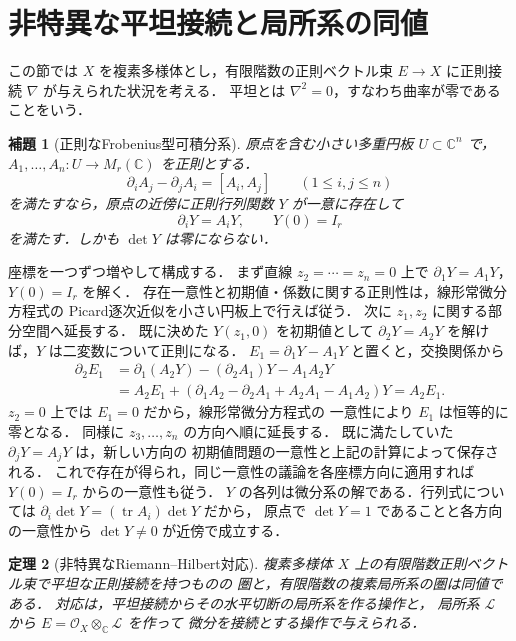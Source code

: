 \documentclass[a5paper,10pt,onecolumn]{jsarticle}
\makeatletter
\theoremstyle{mathnotetheorem}
\newtheorem{theorem}{定理}[section]
\newtheorem{lemma}[theorem]{補題}
\renewcommand{\proofname}{証明}
\renewenvironment{proof}[1][\proofname]{%
  \par\pushQED{\qed}\normalfont\topsep4\p@\@plus2\p@\relax
  \trivlist\item[\hskip\labelsep\bfseries #1]\ignorespaces
}{\popQED\endtrivlist\@endpefalse}
\makeatother
\begin{document}
\section{非特異な平坦接続と局所系の同値}
この節では $X$ を複素多様体とし，有限階数の正則ベクトル束
$E\to X$ に正則接続 $\nabla$ が与えられた状況を考える．
平坦とは $\nabla^2=0$，すなわち曲率が零であることをいう．
\begin{lemma}[正則なFrobenius型可積分系]\label{lem:flatmatrix}
原点を含む小さい多重円板 $U\subset\mathbb C^n$ で，
$A_1,\ldots,A_n:U\to M_r(\mathbb C)$ を正則とする．
\[
 \partial_iA_j-\partial_jA_i=[A_i,A_j]
 \qquad(1\le i,j\le n)
\]
を満たすなら，原点の近傍に正則行列関数
$Y$ が一意に存在して
\[
 \partial_iY=A_iY,\qquad Y(0)=I_r
\]
を満たす．しかも $\det Y$ は零にならない．
\end{lemma}
\begin{proof}
座標を一つずつ増やして構成する．
まず直線 $z_2=\cdots=z_n=0$ 上で
$\partial_1Y=A_1Y$，$Y(0)=I_r$ を解く．
存在一意性と初期値・係数に関する正則性は，線形常微分方程式の
Picard逐次近似を小さい円板上で行えば従う．
次に $z_1,z_2$ に関する部分空間へ延長する．
既に決めた $Y(z_1,0)$ を初期値として
$\partial_2Y=A_2Y$ を解けば，$Y$ は二変数について正則になる．
$E_1=\partial_1Y-A_1Y$ と置くと，交換関係から
\[
 \begin{aligned}
 \partial_2E_1
 &=\partial_1(A_2Y)-(\partial_2A_1)Y-A_1A_2Y\\
 &=A_2E_1+
 (\partial_1A_2-\partial_2A_1+A_2A_1-A_1A_2)Y
 =A_2E_1.
 \end{aligned}
\]
$z_2=0$ 上では $E_1=0$ だから，線形常微分方程式の
一意性により $E_1$ は恒等的に零となる．
同様に $z_3,\ldots,z_n$ の方向へ順に延長する．
既に満たしていた $\partial_jY=A_jY$ は，新しい方向の
初期値問題の一意性と上記の計算によって保存される．
これで存在が得られ，同じ一意性の議論を各座標方向に適用すれば
$Y(0)=I_r$ からの一意性も従う．
$Y$ の各列は微分系の解である．行列式については
$\partial_i\det Y=(\operatorname{tr}A_i)\det Y$ だから，
原点で $\det Y=1$ であることと各方向の一意性から
$\det Y\ne0$ が近傍で成立する．
\end{proof}
\begin{theorem}[非特異なRiemann--Hilbert対応]
複素多様体 $X$ 上の有限階数正則ベクトル束で平坦な正則接続を持つものの
圏と，有限階数の複素局所系の圏は同値である．
対応は，平坦接続からその水平切断の局所系を作る操作と，
局所系 $\mathcal L$ から
$E=\mathcal O_X\otimes_{\mathbb C}\mathcal L$ を作って
微分を接続とする操作で与えられる．
\end{theorem}
\end{document}
